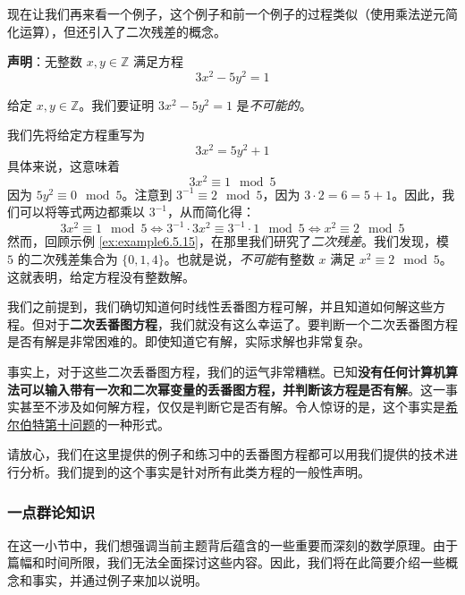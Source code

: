 \begin{example}
    现在让我们再来看一个例子，这个例子和前一个例子的过程类似（使用乘法逆元简化运算），但还引入了二次残差的概念。

    \textbf{声明}：无整数 $x, y \in \mathbb{Z}$ 满足方程
    \[3x^2-5y^2=1\]

    给定 $x, y \in \mathbb{Z}$。我们要证明 $3x^2-5y^2=1$ 是\emph{不可能的}。

    我们先将给定方程重写为
    \[3x^2 = 5y^2+1\]
    具体来说，这意味着
    \[3x^2 \equiv 1 \mod 5\]
    因为 $5y^2 \equiv 0 \mod 5$。注意到 $3^{-1} \equiv 2 \mod 5$，因为 $3 \cdot 2 = 6 = 5 + 1$。因此，我们可以将等式两边都乘以 $3^{-1}$，从而简化得：
    \[3x^2 \equiv 1 \mod 5 \iff 3^{-1} \cdot 3x^2 \equiv 3^{-1} \cdot 1 \mod 5 \iff x^2 \equiv 2 \mod 5\]
    然而，回顾示例 \ref{ex:example6.5.15}，在那里我们研究了\emph{二次残差}。我们发现，模 $5$ 的二次残差集合为 $\{0, 1, 4\}$。也就是说，\emph{不可能}有整数 $x$ 满足 $x^2 \equiv 2 \mod 5$。这就表明，给定方程没有整数解。
\end{example}

\begin{tcolorbox}[colback=gray!10,
    colframe=black,
    width=\textwidth,
    arc=2mm, auto outer arc,
    title={有趣的事实},breakable,enhanced jigsaw,
    before upper={\parindent15pt\noindent},	]
    我们之前提到，我们确切知道何时线性丢番图方程可解，并且知道如何解这些方程。但对于\textbf{二次丢番图方程}，我们就没有这么幸运了。要判断一个二次丢番图方程是否有解是非常困难的。即使知道它有解，实际求解也非常复杂。

    事实上，对于这些二次丢番图方程，我们的运气非常糟糕。已知\textbf{没有任何计算机算法可以输入带有一次和二次幂变量的丢番图方程，并判断该方程是否有解}。这一事实甚至不涉及如何解方程，仅仅是判断它是否有解。令人惊讶的是，这个事实是\href{https://en.wikipedia.org/wiki/Hilbert's_tenth_problem}{希尔伯特第十问题}的一种形式。

    请放心，我们在这里提供的例子和练习中的丢番图方程都可以用我们提供的技术进行分析。我们提到的这个事实是针对所有此类方程的一般性声明。
\end{tcolorbox}

\subsubsection*{一点群论知识}

在这一小节中，我们想强调当前主题背后蕴含的一些重要而深刻的数学原理。由于篇幅和时间所限，我们无法全面探讨这些内容。因此，我们将在此简要介绍一些概念和事实，并通过例子来加以说明。

